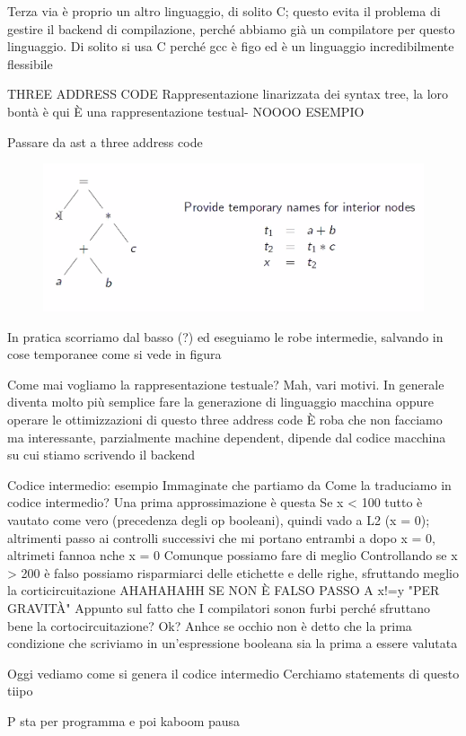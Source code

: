 \documentclass[class=book, crop=false, oneside, 12pt]{standalone}
\begin{document}
Terza via è proprio un altro linguaggio, di solito C; questo evita il problema di gestire il backend di compilazione, perché abbiamo già un compilatore per questo linguaggio.
Di solito si usa C perché gcc è figo ed è un linguaggio incredibilmente flessibile

THREE ADDRESS CODE
Rappresentazione linarizzata dei syntax tree, la loro bontà è qui
È una rappresentazione testual- NOOOO ESEMPIO

Passare da ast a three address code
\begin{figure}[H]
    \centering
    \includegraphics[width=.5\textwidth]{ex1.png}
    \caption{}
    \label{}
\end{figure}
In pratica scorriamo dal basso (?) ed eseguiamo le robe intermedie, salvando in cose temporanee come si vede in figura

Come mai vogliamo la rappresentazione testuale? Mah, vari motivi. In generale diventa molto più semplice fare la generazione di linguaggio macchina oppure operare le ottimizzazioni di questo three address code
È roba che non facciamo ma interessante, parzialmente machine dependent, dipende dal codice macchina su cui stiamo scrivendo il backend

Codice intermedio: esempio
Immaginate che partiamo da 
Come la traduciamo in codice intermedio?
Una prima approssimazione è questa
Se x < 100 tutto è vautato come vero (precedenza degli op booleani), quindi vado a L2 (x = 0); altrimenti passo ai controlli successivi che mi portano entrambi a dopo x = 0, altrimeti fannoa nche x = 0
Comunque possiamo fare di meglio
Controllando se x > 200 è falso possiamo risparmiarci delle etichette e delle righe, sfruttando meglio la corticircuitazione
AHAHAHAHH SE NON È FALSO PASSO A x!=y "PER GRAVITÀ"
Appunto sul fatto che I compilatori sonon furbi perché sfruttano bene la cortocircuitazione? Ok?
Anhce se occhio non è detto che la prima condizione che scriviamo in un'espressione booleana sia la prima a essere valutata

Oggi vediamo come si genera il codice intermedio
Cerchiamo statements di questo tiipo

P sta per programma e poi kaboom pausa
\end{document}
